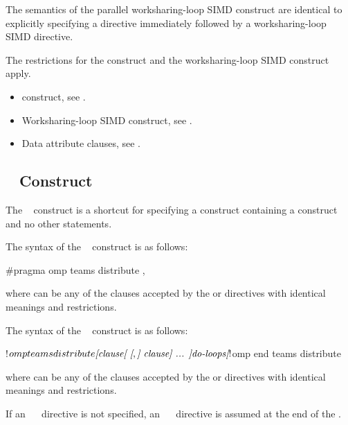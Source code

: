 \descr
The semantics of the parallel worksharing-loop SIMD construct are identical to explicitly specifying
a  directive immediately followed by a worksharing-loop SIMD directive.

\restrictions
The restrictions for the  construct and the worksharing-loop SIMD construct apply.

\crossreferences
\begin{itemize}
\item {} construct, see
.

\item Worksharing-loop SIMD construct, see
.

\item Data attribute clauses, see
.
\end{itemize}



\subsection{~ Construct}
\label{subsec:teams distribute Construct}
\summary
The ~ construct is a shortcut for specifying a  construct
containing a  construct and no other statements.

\syntax
\begin{ccppspecific}
The syntax of the ~ construct is as follows:

\begin{ompcPragma}
#pragma omp teams distribute \plc{[clause[ [},\plc{] clause] ... ] new-line}
\end{ompcPragma}

where  can be any of the clauses accepted by the  or 
directives with identical meanings and restrictions.
\end{ccppspecific}

\begin{fortranspecific}
The syntax of the ~ construct is as follows:

\begin{ompfPragma}
!$omp teams distribute \plc{[clause[ [},\plc{] clause] ... ]}
    \plc{do-loops}
\plc{[}!$omp end teams distribute\plc{]}
\end{ompfPragma}

where  can be any of the clauses accepted by the  or 
directives with identical meanings and restrictions.

If an ~~ directive is not specified, an
~~ directive is assumed at the end of the .
\end{fortranspecific}

